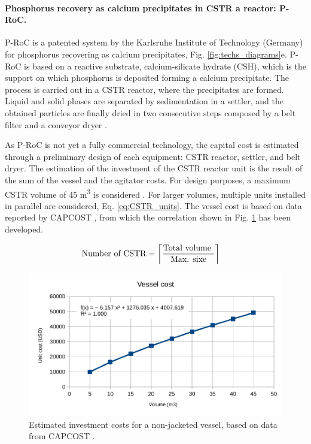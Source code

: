 \documentclass[10pt,a4paper]{article}
\DeclarePairedDelimiter{\ceil}{\lceil}{\rceil}
\begin{document}
\paragraph{Phosphorus recovery as calcium precipitates in CSTR a reactor: P-RoC.}
P-RoC is a patented system by the Karlsruhe Institute of Technology (Germany) for phosphorus recovering as calcium precipitates, Fig. \ref{fig:techs_diagrams}e. P-RoC is based on a reactive substrate, calcium-silicate hydrate (CSH), which is the support on which phosphorus is deposited forming a calcium precipitate. The process is carried out in a CSTR reactor, where the precipitates are formed. Liquid and solid phases are separated by sedimentation in a settler, and the obtained particles are finally dried in two consecutive steps composed by a belt filter and a conveyor dryer .

As P-RoC is not yet a fully commercial technology, the capital cost is estimated through a preliminary design of each equipment: CSTR reactor, settler, and belt dryer. The estimation of the investment of the CSTR reactor unit is the result of the sum of the vessel and the agitator costs. For design purposes, a maximum CSTR volume of 45 m\textsuperscript{3} is considered . For larger volumes, multiple units installed in parallel are considered, Eq. \ref{eq:CSTR_units}. The vessel cost is based on data reported by CAPCOST , from which the correlation shown in Fig. \ref{fig:vessel_investment_cost} has been developed.

\begin{align} \label{eq:CSTR_units}
& \text{Number of CSTR} = \ceil[\bigg]{\frac{\text{Total volume }}{\text{Max. sixe}}}
\end{align}

\begin{figure}[H]
	\centering
	\includegraphics[width=0.6\linewidth]{vessel_investment_cost} 
	\caption{Estimated investment costs for a non-jacketed vessel, based on data from CAPCOST \protect{}.}
	\label{fig:vessel_investment_cost}
\end{figure}
\end{document}

